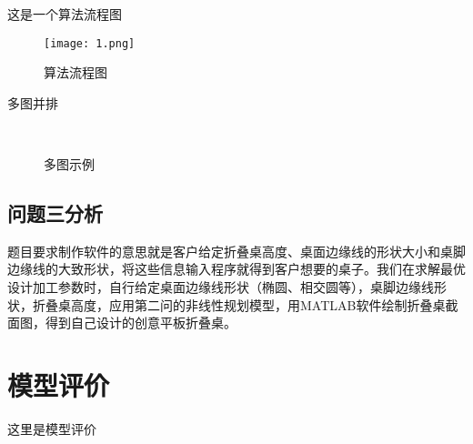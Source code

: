 \documentclass[bwprint]{gmcmthesis}
\begin{document}
这是一个算法流程图
\begin{figure}[htp!]
\centering
\texttt{[image: 1.png]}
\caption{算法流程图}
\end{figure}

多图并排
\begin{figure}[!htp]
	\centering
	\qquad
	 \\
	\qquad
	\caption{多图示例}
\end{figure}


\clearpage
\subsection{问题三分析}

题目要求制作软件的意思就是客户给定折叠桌高度、桌面边缘线的形状大小和桌脚边缘线的大致形状，将这些信息输入程序就得到客户想要的桌子。我们在求解最优设计加工参数时，自行给定桌面边缘线形状（椭圆、相交圆等），桌脚边缘线形状，折叠桌高度，应用第二问的非线性规划模型，用MATLAB软件绘制折叠桌截面图，得到自己设计的创意平板折叠桌。


\section{模型评价}

这里是模型评价




\cite{mittelbach_latex_2004,wright_latex3_2009,beeton_unicode_2008,vieth_experiences_2009}



\end{document}
